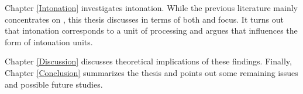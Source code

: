 \begin{refsection}
\newpage 
Chapter \ref{Intonation} investigates intonation.
While the previous literature mainly concentrates on ,
this thesis discusses in terms of both  and focus.
It turns out that intonation corresponds to a unit of processing and
argues that  influences the form of intonation units.

Chapter \ref{Discussion} discusses theoretical implications of these findings.
Finally, Chapter \ref{Conclusion} summarizes the thesis
and points out some remaining issues and possible future studies.

\end{refsection}
